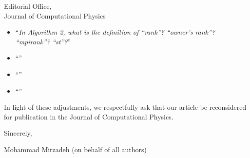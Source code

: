 \documentclass{scrlttr2}
\begin{document}
\begin{letter} {Editorial Office, \\ Journal of Computational
Physics}
\begin{itemize}
\begin{itemize}
Our library is coded in `\texttt{c++}' (with a mix of little `\texttt{c}' code).
We have made adjustments to the to algorithms to make them easier to understand.
However, we believe it is best not to directly use a `\texttt{c++}' syntax to
keep the pseudo-code language-agnostic and accessible to all readers.

\item ``\textit{In Algorithm 2, what is the definition of “rank”? “owner’s
  rank”? “mpirank”? “st”?}''

\item ``\textit{}''

\item ``\textit{}''

\item ``\textit{}'' \end{itemize} \end{itemize}


In light of these adjustments, we respectfully ask that our article be
reconsidered for publication in the Journal of Computational Physics.
\closing{Sincerely,} 
Mohammad Mirzadeh (on behalf of all authors) 
\end{letter}
\end{document}
